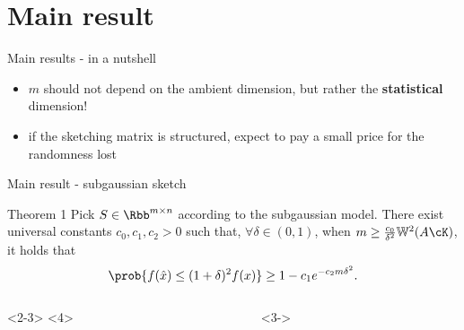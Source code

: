 \documentclass[10pt]{beamer}
\begin{document}
\section{Main result}

\begin{frame}{Main results - in a nutshell}
    \begin{itemize}
    \item<1-> $m$ should not depend on the ambient dimension, but rather the
        \textbf{statistical} dimension!
    \item<2-> if the sketching matrix is structured, expect to pay a small price
        for the randomness lost
    \end{itemize}
\end{frame}

\begin{frame}{Main result - subgaussian sketch}
    \begin{block}{Theorem 1}
        Pick $S \in \Rbb^{m \times n}$ according to the subgaussian model.
        There exist universal constants $c_0, c_1,
        c_2 > 0$ such that, $\forall \delta \in (0, 1)$, when
        \(
            m \geq \frac{c_0}{\delta^2} \mathbb{W}^2(A \cK) \), it holds that
        \[
            \prob{f(\hat{x}) \leq (1 + \delta)^2 f(x)}
            \geq 1 - c_1 e^{-c_2 m \delta^2}.
        \]
    \end{block}
    \vspace{1em}
    \begin{columns}
        \begin{column}{0.49 \textwidth}
            \centering
            \only{
            \begin{tikzpicture}[scale=1.1]
                \duck[speech={\scriptsize So what?},
                      bubblecolour=white!35!cred!25,
                      squareglasses=blue!50!black]
            \end{tikzpicture}}<2-3>
            \only{
            \begin{tikzpicture}[scale=1.1]
                \duck[speech={\tiny $
                    \substack{\text{Sounds sketchy,}\\\text{but OK}}$},
                      bubblecolour=white!35!cred!25,
                      squareglasses=blue!50!black]
            \end{tikzpicture}}<4>
        \end{column}
        \begin{column}{0.49 \textwidth}
            <3->
        \end{column}
    \end{columns}
\end{frame}
\end{document}
